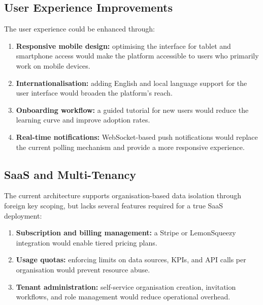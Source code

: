 \subsection{User Experience Improvements}

\noindent
The user experience could be enhanced through:

\begin{enumerate}
  \item \textbf{Responsive mobile design:}
        optimising the interface
        for tablet and smartphone access
        would make the platform accessible
        to users who primarily work on mobile devices.
  \item \textbf{Internationalisation:}
        adding English and local language
        support for the user interface
        would broaden the platform's reach.
  \item \textbf{Onboarding workflow:}
        a guided tutorial
        for new users
        would reduce the learning curve
        and improve adoption rates.
  \item \textbf{Real-time notifications:}
        WebSocket-based push notifications
        would replace the current polling mechanism
        and provide a more responsive experience.
\end{enumerate}

\subsection{SaaS and Multi-Tenancy}

\noindent
The current architecture supports
organisation-based data isolation
through foreign key scoping,
but lacks several features
required for a true SaaS deployment:

\begin{enumerate}
  \item \textbf{Subscription and billing management:}
        a Stripe or LemonSqueezy integration
        would enable tiered pricing plans.
  \item \textbf{Usage quotas:}
        enforcing limits on data sources,
        KPIs, and API calls per organisation
        would prevent resource abuse.
  \item \textbf{Tenant administration:}
        self-service organisation creation,
        invitation workflows,
        and role management
        would reduce operational overhead.
\end{enumerate}

